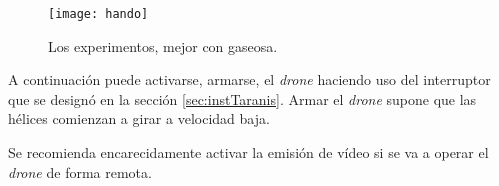 \begin{figure}[H]
	\centering
	\texttt{[image: hando]}
	\caption[Herida producida por hélice del \emph{drone}]{Los experimentos, mejor con gaseosa.}\label{fig:hand}
\end{figure}


A continuación puede activarse, armarse, el \emph{drone} haciendo uso del interruptor que se designó en la sección \ref{sec:instTaranis}. 
Armar el \emph{drone} supone que las hélices comienzan a girar a velocidad baja. 

Se recomienda encarecidamente activar la emisión de vídeo si se va a operar el \emph{drone} de forma remota.






